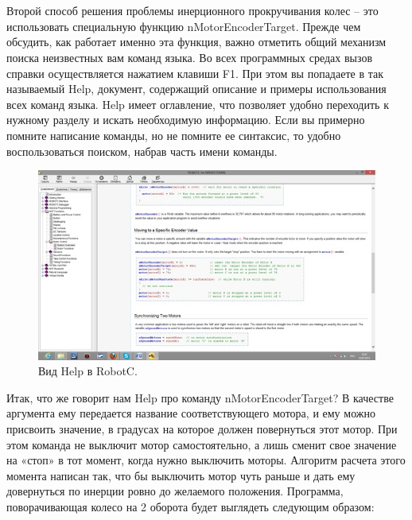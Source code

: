 {\hypertarget{lesson11x2}{}}\\\\

Второй способ решения проблемы инерционного прокручивания колес – это использовать специальную функцию nMotorEncoderTarget. Прежде чем обсудить, как работает именно эта функция, важно отметить общий механизм поиска неизвестных вам команд языка. Во всех программных средах вызов справки осуществляется нажатием клавиши F1. При этом вы попадаете в так называемый Help, документ, содержащий описание и примеры использования всех команд языка. Help  имеет оглавление, что позволяет удобно переходить к нужному разделу и искать необходимую информацию. Если вы примерно помните написание команды, но не помните ее синтаксис, то удобно воспользоваться поиском, набрав часть имени команды.

\begin{figure}[h!]
	\begin{center}
		\includegraphics[width=0.95\linewidth]{chapters/chapter11/images/1}
		\caption{Вид Help в RobotC.}
		\label{ris:image11x1}
	\end{center}
\end{figure}

Итак, что же говорит нам Help про команду nMotorEncoderTarget? В качестве аргумента ему передается название соответствующего мотора, и ему можно присвоить значение, в градусах на которое должен повернуться этот мотор. При этом команда не выключит мотор самостоятельно, а лишь сменит свое значение на «стоп» в тот момент, когда нужно выключить моторы. Алгоритм расчета этого момента написан так, что бы выключить мотор чуть раньше и дать ему довернуться по инерции ровно до желаемого положения. Программа, поворачивающая колесо на 2 оборота будет выглядеть следующим образом:


